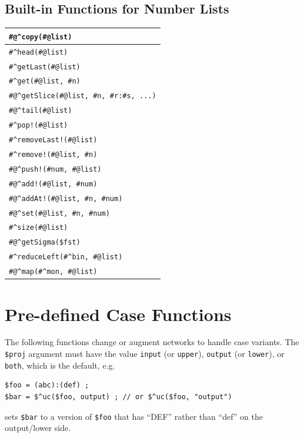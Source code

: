 \documentclass[letterpaper,12pt]{article}
\begin{document}
\subsection{Built-in Functions for Number Lists}

\begin{tabular}{|l|}
\hline
\verb!#@^copy(#@list)! \\
\hline
\verb!#^head(#@list)! \\
\verb!#^getLast(#@list)! \\
\verb!#^get(#@list, #n)! \\
\verb!#@^getSlice(#@list, #n, #r:#s, ...)! \\
\verb!#@^tail(#@list)! \\
\hline
\verb+#^pop!(#@list)+ \\
\verb+#^removeLast!(#@list)+ \\
\verb+#^remove!(#@list, #n)+ \\
\hline
\verb+#@^push!(#num, #@list)+ \\
\verb+#@^add!(#@list, #num)+ \\
\verb+#@^addAt!(#@list, #n, #num)+ \\
\hline
\verb!#@^set(#@list, #n, #num)! \\
\hline
\verb!#^size(#@list)! \\
\verb!#@^getSigma($fst)! \\
\hline
\verb!#^reduceLeft(#^bin, #@list)! \\
\hline
\verb!#@^map(#^mon, #@list)! \\
\hline

\end{tabular}

\newpage

\section{Pre-defined Case Functions}


The following functions change or augment networks to handle case
variants.  The \verb!$proj! argument must have the value \texttt{input}
(or \texttt{upper}), \texttt{output} (or \texttt{lower}), or
\texttt{both}, which is the default, e.g.

\begin{Verbatim}[fontsize=\small]
$foo = (abc):(def) ;
$bar = $^uc($foo, output) ; // or $^uc($foo, "output")
\end{Verbatim}

\noindent
sets \verb!$bar! to a version of \verb!$foo! that has ``DEF'' rather than
``def'' on the output/lower side.
\end{document}

